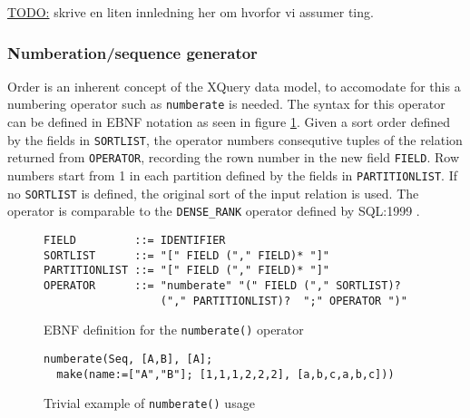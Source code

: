 \underline{\LARGE TODO:} skrive en liten innledning her om hvorfor vi assumer ting.

\subsubsection{Numberation/sequence generator}
Order is an inherent concept of the XQuery data model, to accomodate for this a numbering operator such as
\texttt{numberate} is needed. The syntax for this operator can be defined in EBNF notation as seen in figure
\ref{figure:mql:numberate_ebnf}. Given a sort order defined by the fields in \texttt{SORTLIST}, the operator
numbers consequtive tuples of the relation returned from \texttt{OPERATOR}, recording the rown number in the new
field \texttt{FIELD}. Row numbers start from 1 in each partition defined by the fields in \texttt{PARTITIONLIST}.
If no \texttt{SORTLIST} is defined, the original sort of the input relation is used. The operator is comparable to
the \texttt{DENSE\_RANK} operator defined by SQL:1999 \cite{sqlbook}.

\begin{figure}[!h]
\begin{center}
\begin{Verbatim}
FIELD         ::= IDENTIFIER
SORTLIST      ::= "[" FIELD ("," FIELD)* "]"
PARTITIONLIST ::= "[" FIELD ("," FIELD)* "]"
OPERATOR      ::= "numberate" "(" FIELD ("," SORTLIST)? 
                  ("," PARTITIONLIST)?  ";" OPERATOR ")"
\end{Verbatim}
  \caption{EBNF definition for the \texttt{numberate()} operator}
  \label{figure:mql:numberate_ebnf}
\end{center}
\end{figure}

\begin{figure}[!h]
\begin{center}
\begin{Verbatim}
numberate(Seq, [A,B], [A];
  make(name:=["A","B"]; [1,1,1,2,2,2], [a,b,c,a,b,c]))
\end{Verbatim}
  \caption{Trivial example of \texttt{numberate()} usage}
  \label{figure:mql:numberate_example}
\end{center}
\end{figure}

